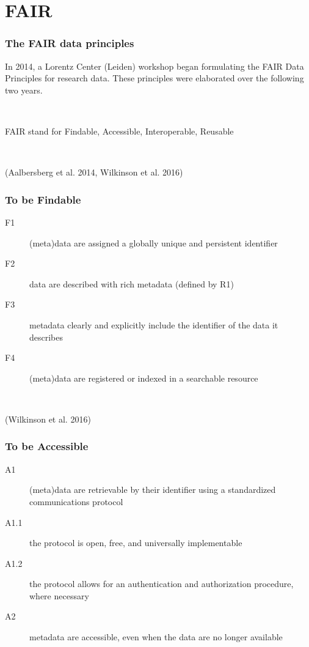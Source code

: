 \documentclass[pdf,sprung,slideColor,nocolorBG]{beamer}
\newenvironment{colortheme}[1]{
\def\ProvidesPackageRCS $##1${\relax}
\renewcommand{\ProcessOptions}{\relax}
\makeatletter

\makeatother
}{}
\newcommand{\slidecite}[1]{\tiny{(#1)}\normalsize{}}
\begin{document}
\section{FAIR}
\begin{colortheme}{jubata}
\begin{frame}
\frametitle{The FAIR data principles}
In 2014, a Lorentz Center (Leiden) workshop began formulating the FAIR 
Data Principles for research data.
These principles were elaborated over the following two years.

~

FAIR stand for Findable, Accessible, Interoperable, Reusable

~

\slidecite{Aalbersberg et al. 2014, Wilkinson et al. 2016}
\end{frame}
\begin{frame}
\frametitle{To be Findable}
\begin{description}
 \item[F1] (meta)data are assigned a globally unique and persistent identifier
 \item[F2] data are described with rich metadata (defined by R1)
 \item[F3] metadata clearly and explicitly include the identifier of the data it describes
 \item[F4] (meta)data are registered or indexed in a searchable resource
\end{description}

~

\slidecite{Wilkinson et al. 2016}
\end{frame}
\begin{frame}
\frametitle{To be Accessible}
\begin{description}
 \item[A1] (meta)data are retrievable by their identifier using a standardized communications protocol
 \item[A1.1] the protocol is open, free, and universally implementable
 \item[A1.2] the protocol allows for an authentication and authorization procedure, where necessary
 \item[A2] metadata are accessible, even when the data are no longer available
\end{description}


\end{frame}
\end{colortheme}
\end{document}
